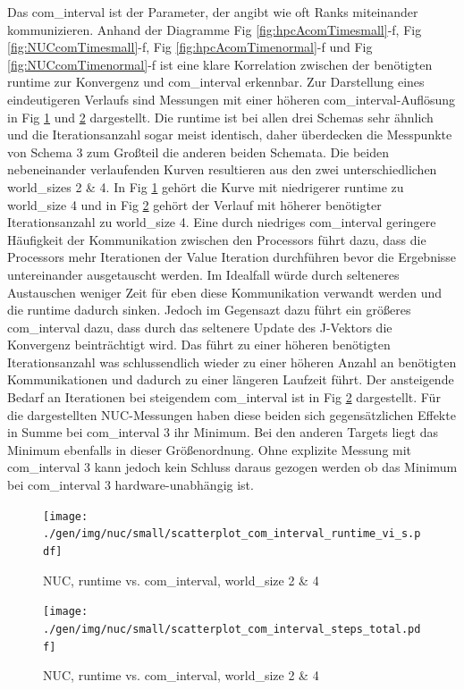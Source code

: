 Das com\_interval ist der Parameter, der angibt wie oft Ranks miteinander kommunizieren.
Anhand der Diagramme Fig \ref{fig:hpcAcomTimesmall}-f, Fig \ref{fig:NUCcomTimesmall}-f, Fig \ref{fig:hpcAcomTimenormal}-f
und Fig \ref{fig:NUCcomTimenormal}-f
ist eine klare Korrelation zwischen der benötigten runtime zur Konvergenz und com\_interval erkennbar. Zur Darstellung eines
eindeutigeren Verlaufs sind Messungen mit einer höheren com\_interval-Auflösung in Fig \ref{fig:ScatRunCom} und \ref{fig:ScatStepCom}
dargestellt. Die runtime ist bei allen drei Schemas sehr ähnlich und die Iterationsanzahl sogar meist identisch,
daher überdecken die Messpunkte von Schema 3 zum Großteil die anderen beiden Schemata. Die beiden nebeneinander verlaufenden Kurven resultieren
aus den zwei unterschiedlichen world\_sizes 2 \& 4. In Fig \ref{fig:ScatRunCom} gehört die Kurve mit niedrigerer runtime zu world\_size 4 und
in Fig \ref{fig:ScatStepCom} gehört der Verlauf mit höherer benötigter Iterationsanzahl zu world\_size 4.
Eine durch niedriges com\_interval geringere Häufigkeit der Kommunikation zwischen den Processors führt dazu, dass die Processors
mehr Iterationen der Value Iteration durchführen bevor die Ergebnisse untereinander ausgetauscht werden.
Im Idealfall würde durch selteneres Austauschen weniger Zeit für eben diese Kommunikation verwandt werden und die runtime dadurch sinken.
Jedoch im Gegensazt dazu führt ein größeres com\_interval dazu, dass durch das seltenere
Update des J-Vektors die Konvergenz beinträchtigt wird. Das führt zu einer höheren benötigten Iterationsanzahl was schlussendlich
wieder zu einer höheren Anzahl an benötigten Kommunikationen und dadurch
zu einer längeren Laufzeit führt. Der ansteigende Bedarf an Iterationen bei steigendem com\_interval ist in Fig \ref{fig:ScatStepCom}
dargestellt.
Für die dargestellten NUC-Messungen haben diese beiden sich gegensätzlichen Effekte in Summe bei com\_interval 3 ihr Minimum.
Bei den anderen Targets liegt das Minimum ebenfalls in dieser Größenordnung. Ohne explizite Messung mit com\_interval 3 kann jedoch
kein Schluss daraus gezogen werden ob das Minimum bei com\_interval 3 hardware-unabhängig ist.

\begin{figure}[h]
\texttt{[image: ./gen/img/nuc/small/scatterplot\_com\_interval\_runtime\_vi\_s.pdf]}
\caption{NUC, runtime vs. com\_interval, world\_size 2 \& 4}
\label{fig:ScatRunCom}
\end{figure}

\begin{figure}[h]
\texttt{[image: ./gen/img/nuc/small/scatterplot\_com\_interval\_steps\_total.pdf]}
\caption{NUC, runtime vs. com\_interval, world\_size 2 \& 4}
\label{fig:ScatStepCom}
\end{figure}

